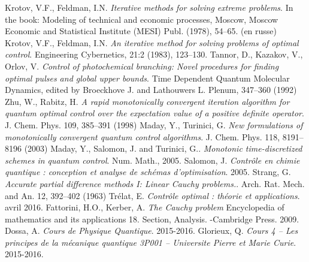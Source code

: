

\begin{thebibliography}{KNU90}
 Krotov, V.F., Feldman, I.N.
\emph{Iterative methods for solving extreme problems}. In the
book: Modeling of technical and economic processes, Moscow, Moscow Economic and Statistical Institute (MESI) Publ. (1978), 54–65. (en russe)
\vspace{0.5cm}
 Krotov, V.F., Feldman, I.N.
\emph{An iterative method for solving problems of optimal control}. Engineering Cybernetics, 21:2 (1983), 123–130.
\vspace{0.5cm}
 Tannor, D., Kazakov, V., Orlov, V.
\emph{Control of photochemical branching: Novel procedures for finding optimal pulses and global upper bounds}. Time Dependent Quantum Molecular Dynamics, edited by Broeckhove J. and Lathouwers L. Plenum, 347–360 (1992)
\vspace{0.5cm}
 Zhu, W., Rabitz, H.
\emph{A rapid monotonically convergent iteration algorithm for quantum optimal control over the expectation value of a positive definite operator}. J. Chem. Phys. 109, 385–391 (1998)
\vspace{0.5cm}
 Maday, Y., Turinici, G. 
\emph{New formulations of monotonically convergent quantum control algorithms}. J. Chem. Phys. 118, 8191–8196 (2003)
\vspace{0.5cm}
 Maday, Y., Salomon, J. and Turinici, G..
\emph{Monotonic time-discretized schemes in quantum control}. Num. Math., 2005.
\vspace{0.5cm}
 Salomon, J.
\emph{Contrôle en chimie quantique : conception et analyse de schémas d’optimisation}. 2005.
\vspace{0.5cm}
 Strang, G. 
\emph{Accurate partial difference methods I: Linear Cauchy problems.}. Arch. Rat. Mech. and An. 12, 392–402 (1963)
\vspace{0.5cm}
 Trélat, E.
\emph{Contrôle optimal : théorie et applications}. avril 2016.
\vspace{0.5cm}
 Fattorini, H.O., Kerber, A.
\emph{The Cauchy problem} Encyclopedia of mathematics and its applications 18. Section, Analysis. -Cambridge Press. 2009.
\vspace{0.5cm}
 Dossa, A.
\emph{Cours de Physique Quantique}. 2015-2016.
\vspace{0.5cm}
 Glorieux, Q.
\emph{Cours 4 – Les principes de la mécanique quantique
3P001 – Universite Pierre et Marie Curie}. 2015-2016.
\end{thebibliography}
